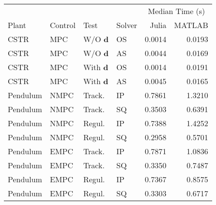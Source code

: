 \begin{tabular}{llllrr}
	
\toprule %

	  &	& & & \multicolumn{2}{c}{Median Time (s)} \\ \cmidrule(l){5-6}
Plant & Control & Test & Solver & Julia & MATLAB \\
\midrule %

CSTR		& MPC	& W/O $\mathbf{d}$	& OS & \num{0.0014} & \num{0.0193}	\\
CSTR		& MPC	& W/O $\mathbf{d}$	& AS & \num{0.0044} & \num{0.0169}	\\
CSTR		& MPC	& With $\mathbf{d}$ & OS & \num{0.0014} & \num{0.0191}	\\
CSTR		& MPC	& With $\mathbf{d}$ & AS & \num{0.0045} & \num{0.0165}	\\
Pendulum 	& NMPC	& Track. 	   		& IP & \num{0.7861} & \num{1.3210}	\\
Pendulum 	& NMPC	& Track. 	   		& SQ & \num{0.3503} & \num{0.6391}	\\
Pendulum    & NMPC	& Regul. 			& IP & \num{0.7388} & \num{1.4252} 	\\
Pendulum    & NMPC	& Regul. 			& SQ & \num{0.2958} & \num{0.5701} 	\\
Pendulum    & EMPC	& Track.			& IP & \num{0.7871} & \num{1.0836} 	\\
Pendulum    & EMPC	& Track.			& SQ & \num{0.3350} & \num{0.7487} 	\\
Pendulum	& EMPC	& Regul. 			& IP & \num{0.7367} & \num{0.8575} 	\\
Pendulum	& EMPC	& Regul. 			& SQ & \num{0.3303} & \num{0.6717}  \\
	
\bottomrule %
	
\end{tabular}